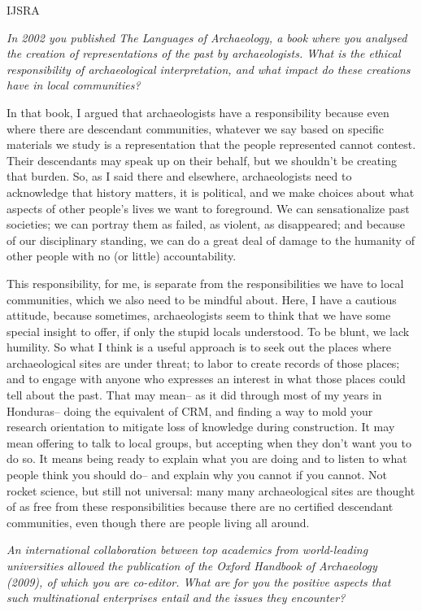 \begin{labeling}{IJSRA}
\item[IJSRA] \textit{In 2002 you published The Languages of Archaeology, a book where you analysed the creation of representations of the past by archaeologists. What is the ethical responsibility of archaeological interpretation, and what impact do these creations have in local communities?} 

\item[RAJ] In that book, I argued that archaeologists have a responsibility because even where there are descendant communities, whatever we say based on specific materials we study is a representation that the people represented cannot contest. Their descendants may speak up on their behalf, but we shouldn't be creating that burden. So, as I said there and elsewhere, archaeologists need to acknowledge that history matters, it is political, and we make choices about what aspects of other people's lives we want to foreground. We can sensationalize past societies; we can portray them as failed, as violent, as disappeared; and because of our disciplinary standing, we can do a great deal of damage to the humanity of other people with no (or little) accountability.

This responsibility, for me, is separate from the responsibilities we have to local communities, which we also need to be mindful about. Here, I have a cautious attitude, because sometimes, archaeologists seem to think that we have some special insight to offer, if only the stupid locals understood. To be blunt, we lack humility. So what I think is a useful approach is to seek out the places where archaeological sites are under threat; to labor to create records of those places; and to engage with anyone who expresses an interest in what those places could tell about the past. That may mean-- as it did through most of my years in Honduras-- doing the equivalent of CRM, and finding a way to mold your research orientation to mitigate loss of knowledge during construction. It may mean offering to talk to local groups, but accepting when they don't want you to do so. It means being ready to explain what you are doing and to listen to what people think you should do-- and explain why you cannot if you cannot. Not rocket science, but still not universal: many many archaeological sites are thought of as free from these responsibilities because there are no certified descendant communities, even though there are people living all around.

\item[IJSRA] \textit{An international collaboration between top academics from world-leading universities allowed the publication of the Oxford Handbook of Archaeology (2009), of which you are co-editor. What are for you the positive aspects that such multinational enterprises entail and the issues they encounter?}


\end{labeling}
